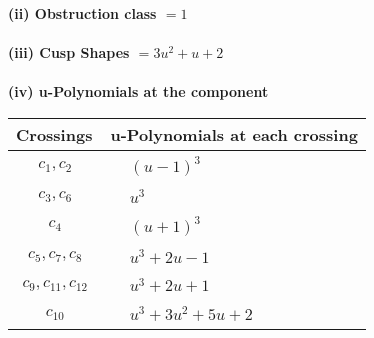 \documentclass[1p]{elsarticle_modified}
\theoremstyle{definition}
\begin{document}
\flushleft \textbf{(ii) Obstruction class $= 1$}\\~\\
\flushleft \textbf{(iii) Cusp Shapes $= 3 u^2+u+2$}\\~\\
\newpage\renewcommand{\arraystretch}{1}
\flushleft \textbf{(iv) u-Polynomials at the component}\newline \\
\begin{tabular}{m{50pt}|m{274pt}}
Crossings & \hspace{64pt}u-Polynomials at each crossing \\
\hline $$\begin{aligned}c_{1},c_{2}\end{aligned}$$&$\begin{aligned}
&(u-1)^3
\end{aligned}$\\
\hline $$\begin{aligned}c_{3},c_{6}\end{aligned}$$&$\begin{aligned}
&u^3
\end{aligned}$\\
\hline $$\begin{aligned}c_{4}\end{aligned}$$&$\begin{aligned}
&(u+1)^3
\end{aligned}$\\
\hline $$\begin{aligned}c_{5},c_{7},c_{8}\end{aligned}$$&$\begin{aligned}
&u^3+2 u-1
\end{aligned}$\\
\hline $$\begin{aligned}c_{9},c_{11},c_{12}\end{aligned}$$&$\begin{aligned}
&u^3+2 u+1
\end{aligned}$\\
\hline $$\begin{aligned}c_{10}\end{aligned}$$&$\begin{aligned}
&u^3+3 u^2+5 u+2
\end{aligned}$\\
\hline
\end{tabular}\\~\\
\newpage\renewcommand{\arraystretch}{1}
\end{document}
